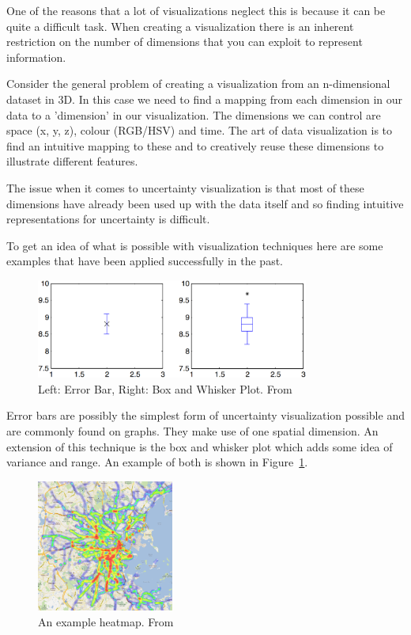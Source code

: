 One of the reasons that a lot of visualizations neglect this is because it can be quite a difficult task. When creating a visualization there is an inherent restriction on the number of dimensions that you can exploit to represent information.

Consider the general problem of creating a visualization from an n-dimensional dataset in 3D. In this case we need to find a mapping from each dimension in our data to a 'dimension' in our visualization. The dimensions we can control are space (x, y, z), colour (RGB/HSV) and time. The art of data visualization is to find an intuitive mapping to these and to creatively reuse these dimensions to illustrate different features.

The issue when it comes to uncertainty visualization is that most of these dimensions have already been used up with the data itself and so finding intuitive representations for uncertainty is difficult.

To get an idea of what is possible with visualization techniques here are some examples that have been applied successfully in the past.

\begin{figure}[H]
    \centering
	\includegraphics[width=0.8\textwidth]{images/background/error_bars.png}
    \caption{Left: Error Bar, Right: Box and Whisker Plot. From \cite{uncertaintyoverview}}
    \label{fig:error_bars}
\end{figure}

Error bars are possibly the simplest form of uncertainty visualization possible and are commonly found on graphs. They make use of one spatial dimension. An extension of this technique is the box and whisker plot which adds some idea of variance and range. An example of both is shown in Figure~\ref{fig:error_bars}.

\begin{figure}[H]
    \centering
	\includegraphics[width=0.4\textwidth]{images/background/heatmap.png}
    \caption{An example heatmap. From \cite{heatmap}}
    \label{fig:heatmap}
\end{figure}

